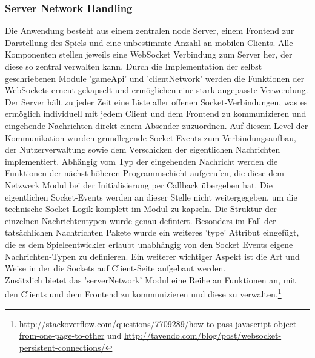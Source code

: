\documentclass[a4paper]{spie}  %
\begin{document}
\subsubsection{Server Network Handling}
Die Anwendung besteht aus einem zentralen node Server, einem Frontend zur Darstellung des Spiels und eine unbestimmte Anzahl an mobilen Clients. Alle Komponenten stellen jeweils eine WebSocket Verbindung zum Server her, der diese so zentral verwalten kann. Durch die Implementation der selbst geschriebenen Module 'gameApi' und 'clientNetwork' werden die Funktionen der WebSockets erneut gekapselt und ermöglichen eine stark angepasste Verwendung.\\
Der Server hält zu jeder Zeit eine Liste aller offenen Socket-Verbindungen, was es ermöglich individuell mit jedem Client und dem Frontend zu kommunizieren und eingehende Nachrichten direkt einem Absender zuzuordnen. Auf diesem Level der Kommunikation wurden grundlegende Socket-Events zum Verbindungsaufbau, der Nutzerverwaltung sowie dem Verschicken der eigentlichen Nachrichten implementiert. Abhängig vom Typ der eingehenden Nachricht werden die Funktionen der nächst-höheren Programmschicht aufgerufen, die diese dem Netzwerk Modul bei der Initialisierung per Callback übergeben hat. Die eigentlichen Socket-Events werden an dieser Stelle nicht weitergegeben, um die technische Socket-Logik komplett im Modul zu kapseln. Die Struktur der einzelnen Nachrichtentypen wurde genau definiert. Besonders im Fall der tatsächlichen Nachtrichten Pakete wurde ein weiteres 'type' Attribut eingefügt, die es dem Spieleentwickler erlaubt unabhängig von den Socket Events eigene Nachrichten-Typen zu definieren. Ein weiterer wichtiger Aspekt ist die Art und Weise in der die Sockets auf Client-Seite aufgebaut werden.\\
Zusätzlich bietet das 'serverNetwork' Modul eine Reihe an Funktionen an, mit den Clients und dem Frontend zu kommunizieren und diese zu verwalten.\footnote{\url{http://stackoverflow.com/questions/7709289/how-to-pass-javascript-object-from-one-page-to-other} und \url{http://tavendo.com/blog/post/websocket-persistent-connections/}}
\end{document}
